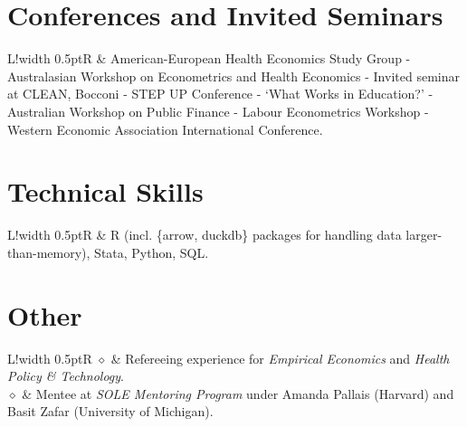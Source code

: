 \documentclass[11pt]{article}
\newcommand\VRule{\color{lightgray}\vrule width 0.5pt}
\begin{document}
\section*{Conferences and Invited Seminars}
\begin{tabular}{L!{\VRule}R}
     & American-European Health Economics Study Group - Australasian Workshop on Econometrics and Health Economics - Invited seminar at CLEAN, Bocconi - STEP UP Conference - `What Works in Education?' - Australian Workshop on Public Finance - Labour Econometrics Workshop - Western Economic Association International Conference. \\
\end{tabular}

\section*{Technical Skills}
\begin{tabular}{L!{\VRule}R}
     & R (incl. \{arrow, duckdb\} packages for handling data larger-than-memory), Stata, Python, SQL. \\
\end{tabular}
\vspace{-0.5cm}
\section*{Other}
\begin{tabular}{L!{\VRule}R}
    $\diamond$ & Refereeing experience for \textit{Empirical Economics} and \textit{Health Policy \& Technology}.                   \\
    $\diamond$ & Mentee at \textit{SOLE Mentoring Program} under Amanda Pallais (Harvard) and Basit Zafar (University of Michigan). \\
\end{tabular}
\end{document}
